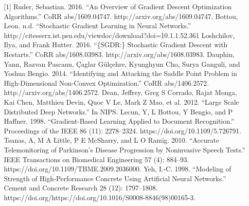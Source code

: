 \documentclass{article}
\begin{document}
[1] Ruder, Sebastian. 2016. “An Overview of Gradient Descent Optimization Algorithms.” CoRR abs/1609.04747. http://arxiv.org/abs/1609.04747. \newline \newline
[2] Bottou, Leon. n.d. “Stochastic Gradient Learning in Neural Networks.” http://citeseerx.ist.psu.edu/viewdoc/download?doi=10.1.1.52.361
\newline \newline
[3] Loshchilov, Ilya, and Frank Hutter. 2016. “\{SGDR:\} Stochastic Gradient Descent with Restarts.” CoRR abs/1608.03983. http://arxiv.org/abs/1608.03983.
\newline \newline
[4] Dauphin, Yann, Razvan Pascanu, Çaglar Gülçehre, Kyunghyun Cho, Surya Ganguli, and Yoshua Bengio. 2014. “Identifying and Attacking the Saddle Point Problem in High-Dimensional Non-Convex Optimization.” CoRR abs/1406.2572. http://arxiv.org/abs/1406.2572.
\newline \newline
[5] Dean, Jeffrey, Greg S Corrado, Rajat Monga, Kai Chen, Matthieu Devin, Quoc V Le, Mark Z Mao, et al. 2012. “Large Scale Distributed Deep Networks.” In NIPS.
\newline \newline
[6] Lecun, Y, L Bottou, Y Bengio, and P Haffner. 1998. “Gradient-Based Learning Applied to Document Recognition.” Proceedings of the IEEE 86 (11): 2278–2324. https://doi.org/10.1109/5.726791.
\newline \newline
[7] Tsanas, A, M A Little, P E McSharry, and L O Ramig. 2010. “Accurate Telemonitoring of Parkinson’s Disease Progression by Noninvasive Speech Tests.” IEEE Transactions on Biomedical Engineering 57 (4): 884–93.\\ https://doi.org/10.1109/TBME.2009.2036000.
\newline \newline
[8] Yeh, I.-C. 1998. “Modeling of Strength of High-Performance Concrete Using Artificial Neural Networks.” Cement and Concrete Research 28 (12): 1797–1808. https://doi.org/https://doi.org/10.1016/S0008-8846(98)00165-3.
\end{document}
